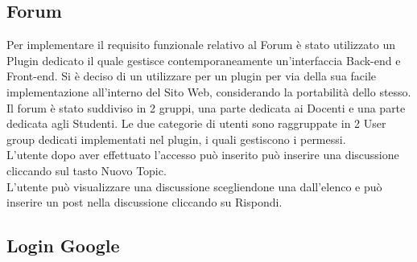 \documentclass{article}
\begin{document}
	\clearpage
	
	\subsection{\textbf{Forum}}

	Per implementare il requisito funzionale relativo al Forum è stato utilizzato un Plugin dedicato il quale gestisce contemporaneamente un'interfaccia Back-end e Front-end. Si è deciso di un utilizzare per un plugin per via della sua facile implementazione all'interno del Sito Web, considerando la portabilità dello stesso.\\
	Il forum è stato suddiviso in 2 gruppi, una parte dedicata ai Docenti e una parte dedicata agli Studenti. Le due categorie di utenti sono raggruppate in 2 User group dedicati implementati nel plugin, i quali gestiscono i permessi.\\
	L'utente dopo aver effettuato l'accesso può inserito può inserire una discussione cliccando sul tasto Nuovo Topic.\\
	L'utente può visualizzare una discussione scegliendone una dall'elenco e può inserire un post nella discussione cliccando su Rispondi.\\
	\subsection{\textbf{Login Google}}
\end{document}
